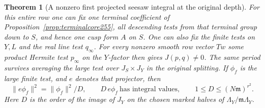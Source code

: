 \documentclass[a4paper,11pt]{article}
\newtheorem{theorem}[proposition]{Theorem}
\theoremstyle{definition}
\theoremstyle{remark}
\numberwithin{equation}{section}
\begin{document}
\begin{theorem}[A nonzero first projected seesaw integral at the original depth]\leavevmode
\label{thm:firstsquare255}
For this entire row one can fix one terminal coefficient of
Proposition~\ref{prop:terminalcore255}, all descending tests
from that terminal group down to \(S\), and hence one cusp
form \(A\) on \(S\). One can also fix the finite tests on \(Y,L\)
and the real line test \(q_\infty\). For every nonzero smooth
row vector \(Tw\) some product Hermite test \(p_\infty\) on the
\(Y\)-factor then gives \(J(p,q)\ne0\).
The same period survives averaging the large test over
\(J_S\times J_Y\) in the original splitting. If \(\phi_f\) is
the large finite test, and \(e\) denotes that projector, then
\[
 \|e\phi_f\|^2=\|\phi_f\|^2/D,\qquad
 D\, e\phi_f\ \text{has integral values},\qquad
 1\le D\le (N\mathfrak m)^{r^2}.
\]
Here \(D\) is the order of the image of \(J_Y\) on the chosen
marked halves of \(\Lambda_Y/\mathfrak m\Lambda_Y\).
\end{theorem}
\end{document}
